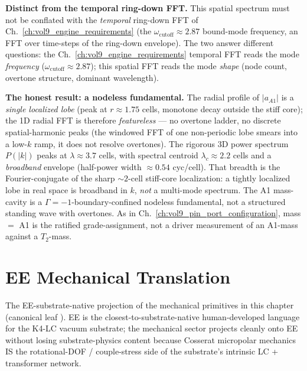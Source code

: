 \medskip\noindent\textbf{Distinct from the temporal ring-down FFT.} This spatial spectrum must not be conflated with the \emph{temporal} ring-down FFT of Ch.~\ref{ch:vol9_engine_requirements} (the $\omega_{\mathrm{cutoff}}\approx2.87$ bound-mode frequency, an FFT over time-steps of the ring-down envelope). The two answer different questions: the Ch.~\ref{ch:vol9_engine_requirements} temporal FFT reads the mode \emph{frequency} ($\omega_{\mathrm{cutoff}}\approx2.87$); this spatial FFT reads the mode \emph{shape} (node count, overtone structure, dominant wavelength).

\medskip\noindent\textbf{The honest result: a nodeless fundamental.} The radial profile of $|a_{A1}|$ is a \emph{single localized lobe} (peak at $r\approx1.75$ cells, monotone decay outside the stiff core); the 1D radial FFT is therefore \emph{featureless} --- no overtone ladder, no discrete spatial-harmonic peaks (the windowed FFT of one non-periodic lobe smears into a low-$k$ ramp, it does not resolve overtones). The rigorous 3D power spectrum $P(|k|)$ peaks at $\lambda\approx3.7$ cells, with spectral centroid $\lambda_c\approx2.2$ cells and a \emph{broadband} envelope (half-power width $\approx0.54$ cyc/cell). That breadth is the Fourier-conjugate of the sharp $\sim2$-cell stiff-core localization: a tightly localized lobe in real space is broadband in $k$, \emph{not} a multi-mode spectrum. The A1 mass-cavity is a $\Gamma=-1$\gammaundeclared{}-boundary-confined nodeless fundamental, not a structured standing wave with overtones. As in Ch.~\ref{ch:vol9_pin_port_configuration}, mass $=$ A1 is the ratified grade-assignment, not a driver measurement of an A1-mass against a $T_2$-mass.



\section{EE Mechanical Translation}
\label{sec:vol9_mech_ee_translation}

The EE-substrate-native projection of the mechanical primitives in this chapter (canonical leaf ). EE is the closest-to-substrate-native human-developed language for the K4-LC vacuum substrate; the mechanical sector projects cleanly onto EE without losing substrate-physics content because Cosserat micropolar mechanics IS the rotational-DOF / couple-stress side of the substrate's intrinsic LC + transformer network.

